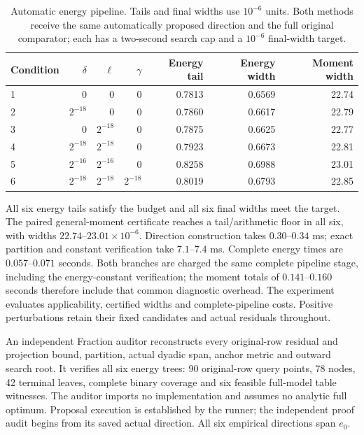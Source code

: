 \begin{table}[t]\centering\small
\caption{Automatic energy pipeline. Tails and final widths use $10^{-6}$ units. Both methods receive the same automatically proposed direction and the full original comparator; each has a two-second search cap and a $10^{-6}$ final-width target.}\label{tab:auto-energy-v80}
\begin{tabular}{lrrrrrr}\toprule Condition&$\delta$&$\ell$&$\gamma$&Energy tail&Energy width&Moment width\\\midrule
1&0&0&0&0.7813&0.6569&22.74\\
2&$2^{-18}$&0&0&0.7860&0.6617&22.79\\
3&0&$2^{-18}$&0&0.7875&0.6625&22.77\\
4&$2^{-18}$&$2^{-18}$&0&0.7923&0.6673&22.81\\
5&$2^{-16}$&$2^{-16}$&0&0.8258&0.6988&23.01\\
6&$2^{-18}$&$2^{-18}$&$2^{-18}$&0.8019&0.6793&22.85\\
\bottomrule\end{tabular}\end{table}

All six energy tails satisfy the budget and all six final widths meet the target. The paired general-moment certificate reaches a tail/arithmetic floor in all six, with widths $22.74$--$23.01\times10^{-6}$. Direction construction takes $0.30$--$0.34$ ms; exact partition and constant verification take $7.1$--$7.4$ ms. Complete energy times are $0.057$--$0.071$ seconds. Both branches are charged the same complete pipeline stage, including the energy-constant verification; the moment totals of $0.141$--$0.160$ seconds therefore include that common diagnostic overhead. The experiment evaluates applicability, certified widths and complete-pipeline costs. Positive perturbations retain their fixed candidates and actual residuals throughout.

An independent Fraction auditor reconstructs every original-row residual and projection bound, partition, actual dyadic span, anchor metric and outward search root. It verifies all six energy trees: 90 original-row query points, 78 nodes, 42 terminal leaves, complete binary coverage and six feasible full-model table witnesses. The auditor imports no implementation and assumes no analytic full optimum. Proposal execution is established by the runner; the independent proof audit begins from its saved actual direction. All six empirical directions span $e_0$.

